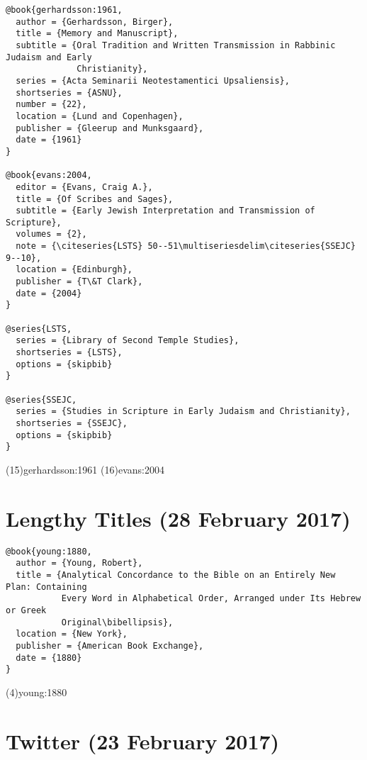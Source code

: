 \documentclass[a4paper]{article}
\begin{document}
\begin{verbatim}
@book{gerhardsson:1961,
  author = {Gerhardsson, Birger},
  title = {Memory and Manuscript},
  subtitle = {Oral Tradition and Written Transmission in Rabbinic Judaism and Early
              Christianity},
  series = {Acta Seminarii Neotestamentici Upsaliensis},
  shortseries = {ASNU},
  number = {22},
  location = {Lund and Copenhagen},
  publisher = {Gleerup and Munksgaard},
  date = {1961}
}

@book{evans:2004,
  editor = {Evans, Craig A.},
  title = {Of Scribes and Sages},
  subtitle = {Early Jewish Interpretation and Transmission of Scripture},
  volumes = {2},
  note = {\citeseries{LSTS} 50--51\multiseriesdelim\citeseries{SSEJC} 9--10},
  location = {Edinburgh},
  publisher = {T\&T Clark},
  date = {2004}
}

@series{LSTS,
  series = {Library of Second Temple Studies},
  shortseries = {LSTS},
  options = {skipbib}
}

@series{SSEJC,
  series = {Studies in Scripture in Early Judaism and Christianity},
  shortseries = {SSEJC},
  options = {skipbib}
}
\end{verbatim}

\examplecite(15){gerhardsson:1961}
\examplecite(16){evans:2004}
\nocite{LSTS, SSEJC}
\exampleabbreviations
\examplebibliography
{}

\section{Lengthy Titles (28 February 2017)}

\begin{verbatim}
@book{young:1880,
  author = {Young, Robert},
  title = {Analytical Concordance to the Bible on an Entirely New Plan: Containing
           Every Word in Alphabetical Order, Arranged under Its Hebrew or Greek
           Original\bibellipsis},
  location = {New York},
  publisher = {American Book Exchange},
  date = {1880}
}
\end{verbatim}

\examplecite(4){young:1880}
\examplebibliography
{}

\section{Twitter (23 February 2017)}
\end{document}
